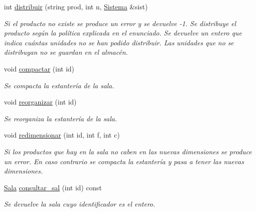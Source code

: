 \begin{DoxyCompactItemize}
int \hyperlink{class_almacen_a257546bb178d1bc7b08443697560281a}{distribuir} (string prod, int n, \hyperlink{class_sistema}{Sistema} \&sist)
\begin{DoxyCompactList}\small\item\em Si el producto no existe se produce un error y se devuelve -\/1. Se distribuye el producto según la política explicada en el enunciado. Se devuelve un entero que indica cuántas unidades no se han podido distribuir. Las unidades que no se distribuyan no se guardan en el almacén. \end{DoxyCompactList}\item 
void \hyperlink{class_almacen_a9b0a893ac5ea4774bd362e297b2c3770}{compactar} (int id)
\begin{DoxyCompactList}\small\item\em Se compacta la estantería de la sala. \end{DoxyCompactList}\item 
void \hyperlink{class_almacen_a9e27219c735096dab9d5d3edc2ae2012}{reorganizar} (int id)
\begin{DoxyCompactList}\small\item\em Se reorganiza la estantería de la sala. \end{DoxyCompactList}\item 
void \hyperlink{class_almacen_a477373756d8671d1acef1c7d84a926a9}{redimensionar} (int id, int f, int c)
\begin{DoxyCompactList}\small\item\em Si los productos que hay en la sala no caben en las nuevas dimensiones se produce un error. En caso contrario se compacta la estantería y pasa a tener las nuevas dimensiones. \end{DoxyCompactList}\item 
\hyperlink{class_sala}{Sala} \hyperlink{class_almacen_ad9a5ab33dd0c247c5d09496fa7d202f1}{consultar\+\_\+sal} (int id) const 
\begin{DoxyCompactList}\small\item\em Se devuelve la sala cuyo identificador es el entero. \end{DoxyCompactList}\end{DoxyCompactItemize}
